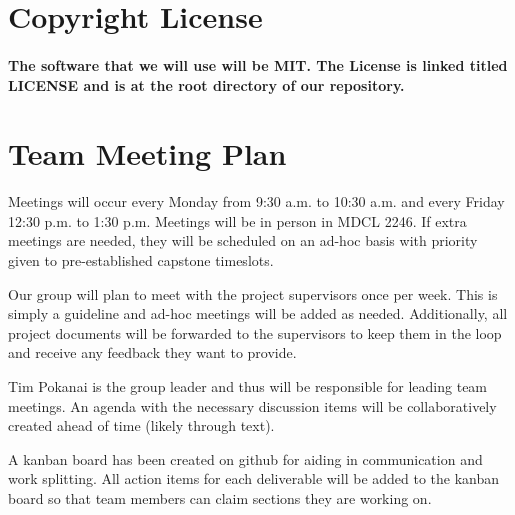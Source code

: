 \documentclass{article}
\begin{document}

\section{Copyright License}

\paragraph{The software that we will use will be MIT. The License is linked titled LICENSE and is at the root directory of our repository.}


\section{Team Meeting Plan}





\par{Meetings will occur every Monday from 9:30 a.m. to 10:30 a.m. and every Friday 12:30 p.m. to 1:30 p.m. Meetings will
be in person in MDCL 2246. If extra meetings are needed, they will be scheduled on an ad-hoc basis with priority given to pre-established capstone timeslots.

Our group will plan to meet with the project supervisors once per week. This is simply a guideline and ad-hoc meetings
will be added as needed. Additionally, all project documents will be forwarded to the supervisors to keep them in the loop and receive any feedback they want to provide.

Tim Pokanai is the group leader and thus will be responsible for leading team meetings. An agenda with the necessary 
discussion items will be collaboratively created ahead of time (likely through text).

A kanban board has been created on github for aiding in communication and work splitting. All action items for each deliverable will
be added to the kanban board so that team members can claim sections they are working on.
}
\end{document}
